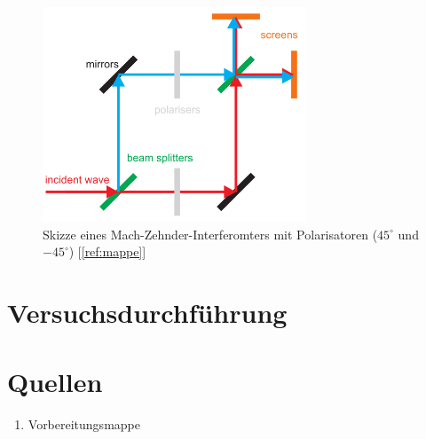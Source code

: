 \documentclass[a4paper,ngerman]{scrartcl}
\begin{document}
\begin{figure}
\includegraphics[width=0.7\textwidth]{mach-zehnder.png}
\caption{Skizze eines Mach-Zehnder-Interferomters mit Polarisatoren ($45^{\circ}$ und $-45^{\circ}$) [\ref{ref:mappe}]}
\label{fig:mach-zehnder}
\end{figure}



\section{Versuchsdurchführung}
\label{sec:versuchsdurchfuhrung}


\clearpage
\section{Quellen}
\begin{enumerate}
\item Vorbereitungsmappe \label{ref:mappe}
\end{enumerate}
\end{document}
